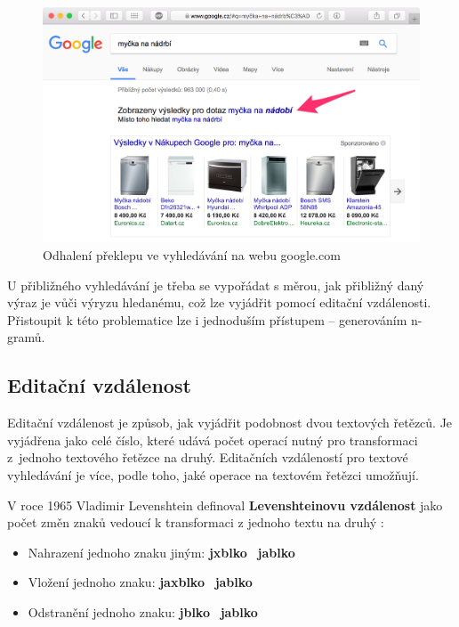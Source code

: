 \documentclass[FM,DP]{tulthesis}
\begin{document}
\begin{figure}[h]
\center
\includegraphics[width=\textwidth]{google-preklep.png}
\caption[Odhalení překlepu ve vyhledávání]{Odhalení překlepu ve vyhledávání na webu google.com}
\label{google-preklep}
\end{figure}

U přibližného vyhledávání je třeba se vypořádat s měrou, jak přibližný daný výraz
je vůči výryzu hledanému, což lze vyjádřit pomocí editační vzdálenosti. Přistoupit
k této problematice lze i jednoduším přístupem -- generováním n-gramů.

\subsection{Editační vzdálenost}

Editační vzdálenost je způsob, jak vyjádřit podobnost dvou textových řetězců. Je
vyjádřena jako celé číslo, které udává počet operací nutný pro transformaci z~jednoho
textového řetězce na druhý. Editačních vzdáleností pro textové vyhledávání je více, 
podle toho, jaké operace na textovém řetězci umožňují.

V roce 1965 Vladimir Levenshtein definoval \textbf{Levenshteinovu vzdálenost} jako počet
změn znaků vedoucí k transformaci z jednoho textu na druhý \cite{es-fuzziness}:

\begin{itemize}
\item Nahrazení jednoho znaku jiným: \textbf{jxblko} \textrightarrow ~\textbf{jablko}
\item Vložení jednoho znaku: \textbf{jaxblko} \textrightarrow ~\textbf{jablko}
\item Odstranění jednoho znaku: \textbf{jblko} \textrightarrow ~\textbf{jablko}
\end{itemize}
\end{document}
